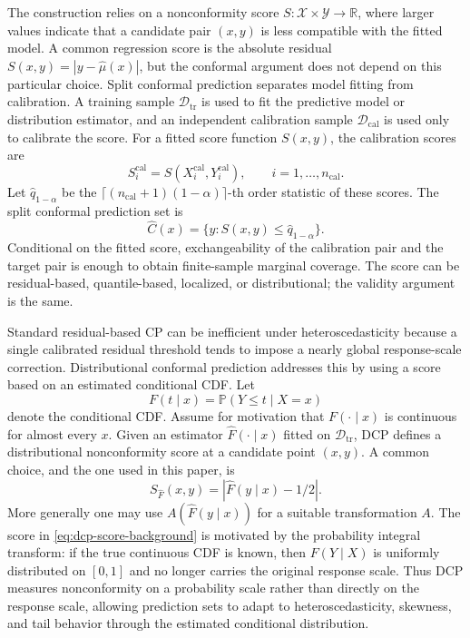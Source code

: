 \documentclass[11pt]{article}
\newcommand{\Xcal}{\mathcal X}
\newcommand{\Ycal}{\mathcal Y}
\newcommand{\Dcal}{\mathcal D}
\newcommand{\Pp}{\mathbb P}
\newcommand{\R}{\mathbb R}
\newcommand{\abs}[1]{\left\lvert #1 \right\rvert}
\begin{document}
The construction relies on a nonconformity score \(S:\Xcal\times\Ycal\to\R\), where larger values indicate that a candidate pair \((x,y)\) is less compatible with the fitted model. A common regression score is the absolute residual \(S(x,y)=|y-\widehat\mu(x)|\), but the conformal argument does not depend on this particular choice. Split conformal prediction separates model fitting from calibration. A training sample \(\Dcal_{\mathrm{tr}}\) is used to fit the predictive model or distribution estimator, and an independent calibration sample \(\Dcal_{\mathrm{cal}}\) is used only to calibrate the score. For a fitted score function \(S(x,y)\), the calibration scores are
\[
  S_i^{\mathrm{cal}}=S(X_i^{\mathrm{cal}},Y_i^{\mathrm{cal}}),
  \qquad i=1,\ldots,n_{\mathrm{cal}}.
\]
Let \(\widehat q_{1-\alpha}\) be the \(\lceil(n_{\mathrm{cal}}+1)(1-\alpha)\rceil\)-th order statistic of these scores. The split conformal prediction set is
\[
  \widehat C(x)=\{y:S(x,y)\le \widehat q_{1-\alpha}\}.
\]
Conditional on the fitted score, exchangeability of the calibration pair and the target pair is enough to obtain finite-sample marginal coverage. The score can be residual-based, quantile-based, localized, or distributional; the validity argument is the same.

Standard residual-based CP can be inefficient under heteroscedasticity because a single calibrated residual threshold tends to impose a nearly global response-scale correction. Distributional conformal prediction addresses this by using a score based on an estimated conditional CDF. Let
\[
  F(t\mid x)=\Pp(Y\le t\mid X=x)
\]
denote the conditional CDF. Assume for motivation that \(F(\cdot\mid x)\) is continuous for almost every \(x\). Given an estimator \(\widehat F(\cdot\mid x)\) fitted on \(\Dcal_{\mathrm{tr}}\), DCP defines a distributional nonconformity score at a candidate point \((x,y)\). A common choice, and the one used in this paper, is
\begin{equation}
  S_{\widehat F}(x,y)=\abs{\widehat F(y\mid x)-1/2}.
  \label{eq:dcp-score-background}
\end{equation}
More generally one may use \(A(\widehat F(y\mid x))\) for a suitable transformation \(A\). The score in \eqref{eq:dcp-score-background} is motivated by the probability integral transform: if the true continuous CDF is known, then \(F(Y\mid X)\) is uniformly distributed on \([0,1]\) and no longer carries the original response scale. Thus DCP measures nonconformity on a probability scale rather than directly on the response scale, allowing prediction sets to adapt to heteroscedasticity, skewness, and tail behavior through the estimated conditional distribution.
\end{document}
